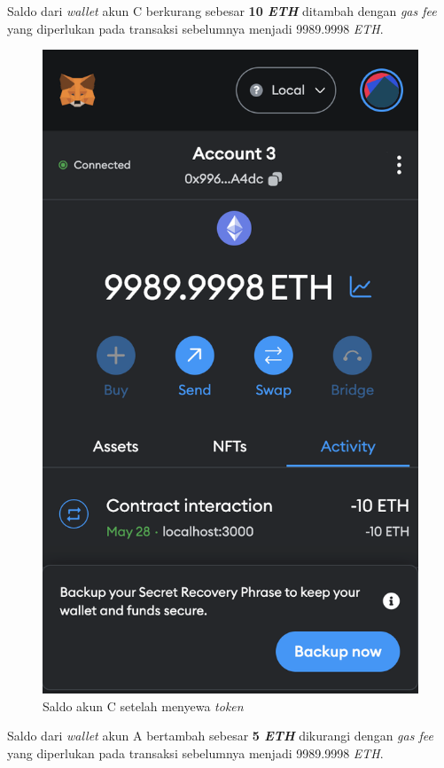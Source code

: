 \begin{itemize}
        Saldo dari \emph{wallet} akun C berkurang sebesar \textbf{10 \emph{ETH}} ditambah dengan \emph{gas fee} yang diperlukan pada transaksi sebelumnya menjadi 9989.9998 \emph{ETH}.
        \begin{figure} [H] \centering
          \includegraphics[scale=0.4]{gambar/img-test-share-rent-5.png}
          \caption{Saldo akun C setelah menyewa \emph{token}}
          \label{fig:TestShareResultRental3}
        \end{figure}
        Saldo dari \emph{wallet} akun A bertambah sebesar \textbf{5 \emph{ETH}} dikurangi dengan \emph{gas fee} yang diperlukan pada transaksi sebelumnya menjadi 9989.9998 \emph{ETH}. 

\end{itemize}
